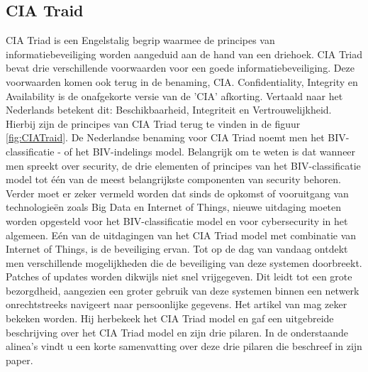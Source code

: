 \subsection{CIA Traid}
CIA Triad is een Engelstalig begrip waarmee de principes van informatiebeveiliging worden aangeduid aan de hand van een driehoek. CIA Triad bevat drie verschillende voorwaarden voor een goede informatiebeveiliging. Deze voorwaarden komen ook terug in de benaming, CIA. Confidentiality, Integrity en Availability is de onafgekorte versie van de 'CIA' afkorting. Vertaald naar het Nederlands betekent dit: Beschikbaarheid, Integriteit en Vertrouwelijkheid. Hierbij zijn de principes van CIA Triad terug te vinden in de figuur \ref{fig:CIATraid}. De Nederlandse benaming voor CIA Triad noemt men het BIV-classificatie - of het BIV-indelings model. Belangrijk om te weten is dat wanneer men spreekt over security, de drie elementen of principes van het BIV-classificatie model tot één van de meest belangrijkste componenten van security behoren. 
\newline
\newline 
Verder moet er zeker vermeld worden dat sinds de opkomst of vooruitgang van technologieën zoals Big Data en Internet of Things, nieuwe uitdaging moeten worden opgesteld voor het BIV-classificatie model en voor cybersecurity in het algemeen.
\newline
\newline  
Eén van de uitdagingen van het CIA Triad model met combinatie van Internet of Things, is de beveiliging ervan. Tot op de dag van vandaag ontdekt men verschillende mogelijkheden die de beveiliging van deze systemen doorbreekt. Patches of updates worden dikwijls niet snel vrijgegeven. Dit leidt tot een grote bezorgdheid, aangezien een groter gebruik van deze systemen binnen een netwerk onrechtstreeks navigeert naar persoonlijke gegevens.
\newline
\newline 
Het artikel van \cite{Samonas2014} mag zeker bekeken worden. Hij herbekeek het CIA Triad model en gaf een uitgebreide beschrijving over het CIA Triad model en zijn drie pilaren. In de onderstaande alinea’s vindt u een korte samenvatting over deze drie pilaren die \cite{Samonas2014} beschreef in zijn paper.

